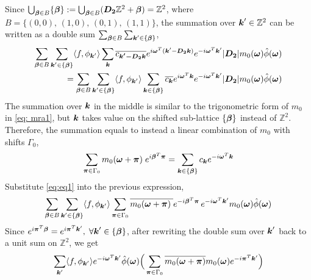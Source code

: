 Since $\bigcup_{\boldsymbol{\beta}\in B} \{\boldsymbol{\beta}\} :=\bigcup_{\boldsymbol{\beta}\in B}(\boldsymbol{D_2}\mathbb{Z}^2+\boldsymbol{\beta}) = \mathbb{Z}^2$, where $B = \{ (0,0),\,(1,0),\,(0,1),\,(1,1)\}$, the summation over $\boldsymbol{k}'\in \mathbb{Z}^2$ can be written as a double sum $\sum_{\boldsymbol{\beta}\in B}\sum_{\boldsymbol{k}'\in \{\boldsymbol{\beta}\}}$,
\begin{align*}
\sum_{\boldsymbol{\beta}\in B}\sum_{\boldsymbol{k}'\in\{\boldsymbol{\beta}\}} \langle f,\phi_{\boldsymbol{k}'}\rangle\sum_{\boldsymbol{k}}\overline{c_{\boldsymbol{k'-D_2k}}}e^{i\boldsymbol{\omega}^T(\boldsymbol{k}'-\boldsymbol{D_2k})}e^{-i\boldsymbol{\omega}^T\boldsymbol{k}'}|\boldsymbol{D_2}|m_0(\boldsymbol{\omega})\hat{\phi}(\boldsymbol{\omega})\\
=\sum_{\boldsymbol{\beta}\in B}\sum_{\boldsymbol{k}'\in\{\boldsymbol{\beta}\}} \langle f,\phi_{\boldsymbol{k}'}\rangle\sum_{\boldsymbol{k}\in\{\boldsymbol{\beta}\}}\overline{c_{\boldsymbol{k}}}e^{i\boldsymbol{\omega}^T\boldsymbol{k}}e^{-i\boldsymbol{\omega}^T\boldsymbol{k}'}|\boldsymbol{D_2}|m_0(\boldsymbol{\omega})\hat{\phi}(\boldsymbol{\omega})
\end{align*}
The summation over $\boldsymbol{k}$ in the middle is similar to the trigonometric form of $m_0$ in \eqref{eq: mra1}, but $\boldsymbol{k}$ takes value on the shifted sub-lattice $\{\boldsymbol{\beta}\}$ instead of $\mathbb{Z}^2$. Therefore, the summation equals to instead a linear combination of $m_0$ with shifts $\Gamma_0$,
\begin{align}\label{eq:eq1}
\sum_{\boldsymbol{\pi}\in\Gamma_0}m_0(\boldsymbol{\omega}+\boldsymbol{\pi})\;e^{i\boldsymbol{\beta}^T\boldsymbol{\pi}} = \sum_{\boldsymbol{k}\in \{\boldsymbol{\beta}\}}c_{\boldsymbol{k}}e^{-i\boldsymbol{\omega}^T\boldsymbol{k}}
\end{align}
Substitute \eqref{eq:eq1} into the previous expression,
\begin{align*}
\sum_{\boldsymbol{\beta}\in B}\sum_{\boldsymbol{k}'\in \{\boldsymbol{\beta}\}}\langle f,\phi_{\boldsymbol{k}'}\rangle\sum_{\boldsymbol{\pi}\in\Gamma_0}\overline{m_0(\boldsymbol{\omega}+\boldsymbol{\pi})\;}e^{-i\boldsymbol{\beta}^T\boldsymbol{\pi}}\,e^{-i\boldsymbol{\omega}^T\boldsymbol{k}'}m_0(\boldsymbol{\omega})\hat{\phi}(\boldsymbol{\omega})
\end{align*}
Since $e^{i \boldsymbol{\pi}^{T}\boldsymbol{\beta}}=e^{i\boldsymbol{\pi}^T\boldsymbol{k}'},\; \forall \boldsymbol{k}'\in \{\boldsymbol{\beta}\} $, after rewriting the double sum over $\boldsymbol{k}'$ back to a unit sum on $\mathbb{Z}^2$, we get
\begin{align*}
\sum_{\boldsymbol{k}'}\langle f,\phi_{\boldsymbol{k}'}\rangle e^{-i\boldsymbol{\omega} ^T\boldsymbol{k}'}\hat{\phi}(\boldsymbol{\omega})\Big(\sum_{\boldsymbol{\pi}\in\Gamma_0}\overline{m_0(\boldsymbol{\omega}+\boldsymbol{\pi})}m_0(\boldsymbol{\omega})e^{-i\boldsymbol{\pi}^T\boldsymbol{k}'} \Big)
\end{align*}

